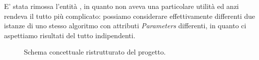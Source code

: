 \documentclass{article}
\begin{document}
E' stata rimossa l'entità , in quanto non aveva una particolare utilità ed anzi rendeva il tutto più complicato: possiamo considerare effettivamente differenti due istanze di uno stesso algoritmo con attributi \emph{Parameters} differenti, in quanto ci aspettiamo risultati del tutto indipendenti.

\begin{figure}[H]
    \caption{Schema concettuale ristrutturato del progetto.}
\end{figure}
\end{document}

